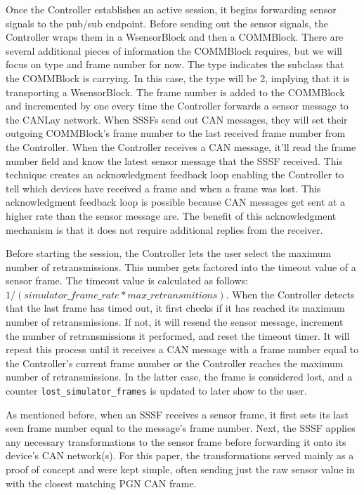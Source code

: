 \documentclass[letterpaper,twocolumn,12pt]{article}
\begin{document}
Once the Controller establishes an active session, it begins forwarding sensor signals to the pub/sub endpoint. Before sending out the sensor signals, the Controller wraps them in a WsensorBlock and then a COMMBlock. There are several additional pieces of information the COMMBlock requires, but we will focus on type and frame number for now. The type indicates the subclass that the COMMBlock is carrying. In this case, the type will be 2, implying that it is transporting a WsensorBlock. The frame number is added to the COMMBlock and incremented by one every time the Controller forwards a sensor message to the CANLay network. When SSSFs send out CAN messages, they will set their outgoing COMMBlock's frame number to the last received frame number from the Controller. When the Controller receives a CAN message, it'll read the frame number field and know the latest sensor message that the SSSF received. This technique creates an acknowledgment feedback loop enabling the Controller to tell which devices have received a frame and when a frame was lost. This acknowledgment feedback loop is possible because CAN messages get sent at a higher rate than the sensor message are. 
The benefit of this acknowledgment mechanism is that it does not require additional replies from the receiver.

Before starting the session, the Controller lets the user select the maximum number of retransmissions. This number gets factored into the timeout value of a sensor frame. 
The timeout value is calculated as follows: $1/(simulator\_frame\_rate * max\_retransmitions)$. When the Controller detects that the last frame has timed out, it first checks if it has reached its maximum number of retransmissions. If not, it will resend the sensor message, increment the number of retransmissions it performed, and reset the timeout timer. It will repeat this process until it receives a CAN message with a frame number equal to the Controller's current frame number or the Controller reaches the maximum number of retransmissions. In the latter case, the frame is considered lost, and a counter \texttt{lost\_simulator\_frames} is updated to later show to the user.

As mentioned before, when an SSSF receives a sensor frame, it first sets its last seen frame number equal to the message's frame number. Next, the SSSF applies any necessary transformations to the sensor frame before forwarding it onto its device's CAN network(s). For this paper, the transformations served mainly as a proof of concept and were kept simple, often sending just the raw sensor value in with the closest matching PGN CAN frame.
\end{document}
